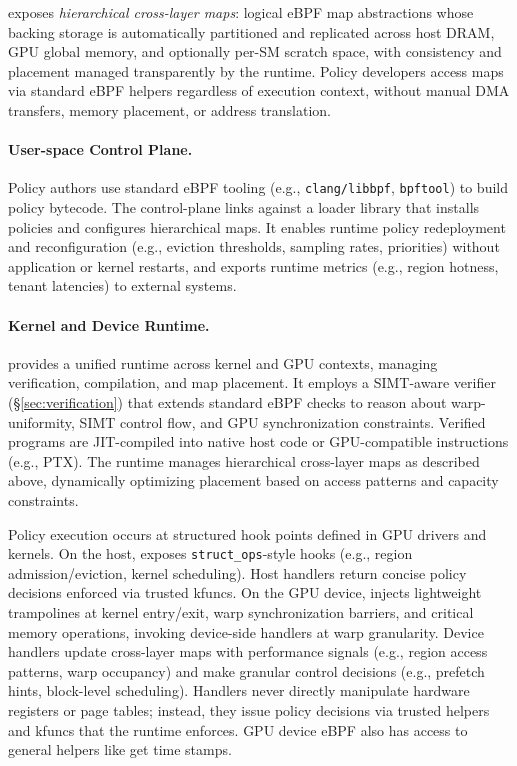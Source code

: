 \sys exposes \emph{hierarchical cross-layer maps}: logical eBPF map abstractions whose backing storage is automatically partitioned and replicated across host DRAM, GPU global memory, and optionally per-SM scratch space, with consistency and placement managed transparently by the runtime. Policy developers access maps via standard eBPF helpers regardless of execution context, without manual DMA transfers, memory placement, or address translation.

\paragraph{User-space Control Plane.}
Policy authors use standard eBPF tooling (e.g., \texttt{clang/libbpf}, \texttt{bpftool}) to build policy bytecode. The control-plane links against a loader library that installs policies and configures hierarchical maps. It enables runtime policy redeployment and reconfiguration (e.g., eviction thresholds, sampling rates, priorities) without application or kernel restarts, and exports runtime metrics (e.g., region hotness, tenant latencies) to external systems.

\paragraph{Kernel and Device Runtime.}
\sys provides a unified runtime across kernel and GPU contexts, managing verification, compilation, and map placement. It employs a SIMT-aware verifier (\S\ref{sec:verification}) that extends standard eBPF checks to reason about warp-uniformity, SIMT control flow, and GPU synchronization constraints. Verified programs are JIT-compiled into native host code or GPU-compatible instructions (e.g., PTX). The runtime manages hierarchical cross-layer maps as described above, dynamically optimizing placement based on access patterns and capacity constraints.

Policy execution occurs at structured hook points defined in GPU drivers and kernels. On the host, \sysdriver exposes \texttt{struct\_ops}-style hooks (e.g., region admission/eviction, kernel scheduling). Host handlers return concise policy decisions enforced via trusted kfuncs. On the GPU device, \sys injects lightweight trampolines at kernel entry/exit, warp synchronization barriers, and critical memory operations, invoking device-side handlers at warp granularity. Device handlers update cross-layer maps with performance signals (e.g., region access patterns, warp occupancy) and make granular control decisions (e.g., prefetch hints, block-level scheduling). Handlers never directly manipulate hardware registers or page tables; instead, they issue policy decisions via trusted helpers and kfuncs that the runtime enforces. GPU device eBPF also has access to general helpers like get time stamps.

